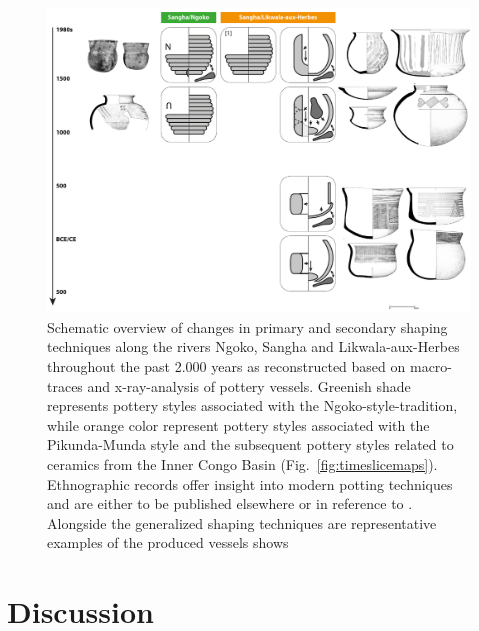 \documentclass[smallextended,natbib]{svjour3}       %
\begin{document}
\begin{figure}[!tb]
	\includegraphics[width=\textwidth]{Fig_ShapingTech_Schema.pdf}
	\caption{Schematic overview of changes in primary and secondary shaping techniques along the rivers Ngoko, Sangha and Likwala-aux-Herbes throughout the past 2.000 years as reconstructed based on macro-traces and x-ray-analysis of pottery vessels. Greenish shade represents pottery styles associated with the Ngoko-style-tradition, while orange color represent pottery styles associated with the Pikunda-Munda style and the subsequent pottery styles related to ceramics from the Inner Congo Basin (Fig.~\ref{fig:timeslicemaps}). Ethnographic records offer insight into modern potting techniques and are either to be published elsewhere \citep{Eggert.inVorb.} or in reference to \citet[{[1]};][25--35]{MpikaNgoma.1996}. Alongside the generalized shaping techniques are representative examples of the produced vessels shows \citep[cf.][]{Seidensticker.2021e,Seidensticker.2024}}
	\label{fig:schema}
\end{figure}

\section{Discussion}

\end{document}
